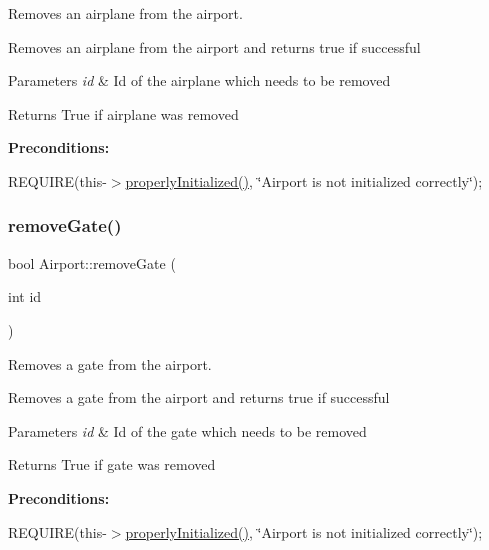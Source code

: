 Removes an airplane from the airport. 

Removes an airplane from the airport and returns true if successful


\begin{DoxyParams}{Parameters}
{\em id} & Id of the airplane which needs to be removed \\
\hline
\end{DoxyParams}
\begin{DoxyReturn}{Returns}
True if airplane was removed
\end{DoxyReturn}
{\bfseries Preconditions\+:}
\begin{DoxyItemize}
\item R\+E\+Q\+U\+I\+RE(this-\/$>$\mbox{\hyperlink{class_airport_aa13e68ac58e8875837fbe888325cfff6}{properly\+Initialized()}}, \char`\"{}\+Airport is not initialized correctly\char`\"{}); 
\end{DoxyItemize}\mbox{\label{class_airport_ad0c61d46c5c811fb9a2d45be1826088c}} 
\subsubsection{\texorpdfstring{remove\+Gate()}{removeGate()}}
{\footnotesize\ttfamily bool Airport\+::remove\+Gate (\begin{DoxyParamCaption}\item[{int}]{id }\end{DoxyParamCaption})}



Removes a gate from the airport. 

Removes a gate from the airport and returns true if successful


\begin{DoxyParams}{Parameters}
{\em id} & Id of the gate which needs to be removed \\
\hline
\end{DoxyParams}
\begin{DoxyReturn}{Returns}
True if gate was removed
\end{DoxyReturn}
{\bfseries Preconditions\+:}
\begin{DoxyItemize}
\item R\+E\+Q\+U\+I\+RE(this-\/$>$\mbox{\hyperlink{class_airport_aa13e68ac58e8875837fbe888325cfff6}{properly\+Initialized()}}, \char`\"{}\+Airport is not initialized correctly\char`\"{}); 
\end{DoxyItemize}\mbox{\label{class_airport_adb2735f0f7402bdf3946b17b10498b67}} 
